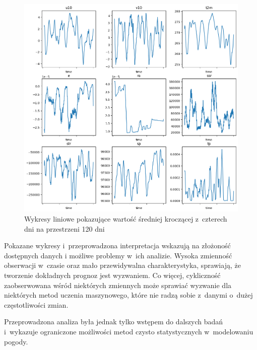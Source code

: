 \begin{figure}[H]
    \centering
    \includegraphics[width=\textwidth]{images/line.png}
    \caption{Wykresy liniowe pokazujące wartość średniej kroczącej z~czterech dni na przestrzeni 120 dni}
    \label{line}
\end{figure}

Pokazane wykresy i~przeprowadzona interpretacja wskazują na złożoność dostępnych danych
i możliwe problemy w~ich analizie. Wysoka zmienność obserwacji w~czasie oraz mało przewidywalna
charakterystyka, sprawiają, że tworzenie dokładnych prognoz jest wyzwaniem. Co więcej, 
cykliczność zaobserwowana wśród niektórych zmiennych może sprawiać wyzwanie dla niektórych
metod uczenia maszynowego, które nie radzą sobie z~danymi o~dużej częstotliwości zmian. 

Przeprowadzona analiza była jednak tylko wstępem do dalszych badań i~wykazuje ograniczone
możliwości metod czysto statystycznych w~modelowaniu pogody.